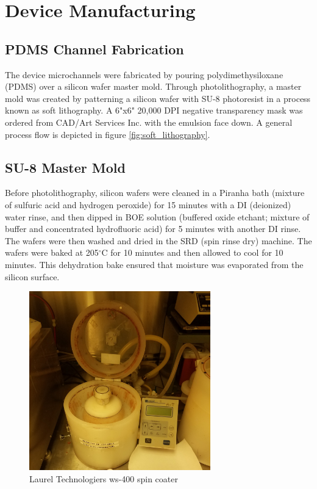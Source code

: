 
\section{Device Manufacturing}

\subsection{PDMS Channel Fabrication}
\par The device microchannels were fabricated by pouring polydimethysiloxane (PDMS) over a silicon wafer master mold. Through photolithography, a master mold was created by patterning a silicon wafer with SU-8 photoresist in  a process known as soft lithography. A 6"x6" 20,000 DPI negative transparency mask was ordered from CAD/Art Services Inc. with the emulsion face down. A general process flow is depicted in figure \ref{fig:soft_lithography}.


\subsection*{SU-8 Master Mold}

\par Before photolithography, silicon wafers were cleaned in a Piranha bath (mixture of sulfuric acid and hydrogen peroxide) for 15 minutes with a DI (deionized) water rinse, and then dipped in BOE solution (buffered oxide etchant; mixture of buffer and concentrated hydrofluoric acid) for 5 minutes with another DI rinse. The wafers were then washed and dried in the SRD (spin rinse dry) machine. The wafers were baked at 205$^\circ$C for 10 minutes and then allowed to cool for 10 minutes. This dehydration bake ensured that moisture was evaporated from the silicon surface.

\begin{figure}[h]
    \centering
    \includegraphics[width=0.7\textwidth]{images/resist_spinner_open.jpg}
    \caption{Laurel Technologiers ws-400 spin coater}
    \label{fig:spin_coater}
\end{figure}

